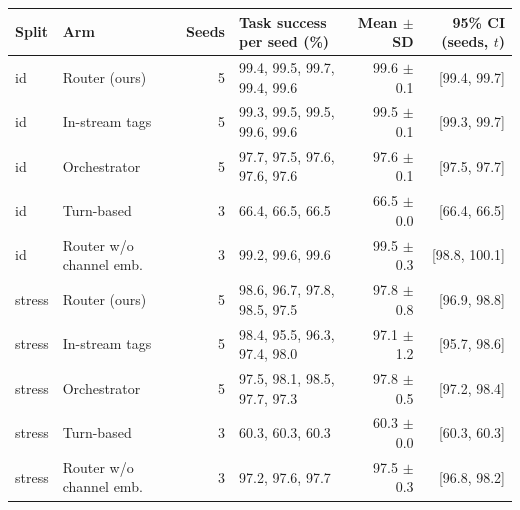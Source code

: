 \begin{tabular}{llrlrr}
\toprule
Split & Arm & Seeds & Task success per seed (\%) & Mean $\pm$ SD & 95\% CI (seeds, $t$) \\
\midrule
id & Router (ours) & 5 & 99.4, 99.5, 99.7, 99.4, 99.6 & 99.6 $\pm$ 0.1 & [99.4, 99.7] \\
id & In-stream tags & 5 & 99.3, 99.5, 99.5, 99.6, 99.6 & 99.5 $\pm$ 0.1 & [99.3, 99.7] \\
id & Orchestrator & 5 & 97.7, 97.5, 97.6, 97.6, 97.6 & 97.6 $\pm$ 0.1 & [97.5, 97.7] \\
id & Turn-based & 3 & 66.4, 66.5, 66.5 & 66.5 $\pm$ 0.0 & [66.4, 66.5] \\
id & Router w/o channel emb. & 3 & 99.2, 99.6, 99.6 & 99.5 $\pm$ 0.3 & [98.8, 100.1] \\
stress & Router (ours) & 5 & 98.6, 96.7, 97.8, 98.5, 97.5 & 97.8 $\pm$ 0.8 & [96.9, 98.8] \\
stress & In-stream tags & 5 & 98.4, 95.5, 96.3, 97.4, 98.0 & 97.1 $\pm$ 1.2 & [95.7, 98.6] \\
stress & Orchestrator & 5 & 97.5, 98.1, 98.5, 97.7, 97.3 & 97.8 $\pm$ 0.5 & [97.2, 98.4] \\
stress & Turn-based & 3 & 60.3, 60.3, 60.3 & 60.3 $\pm$ 0.0 & [60.3, 60.3] \\
stress & Router w/o channel emb. & 3 & 97.2, 97.6, 97.7 & 97.5 $\pm$ 0.3 & [96.8, 98.2] \\
\bottomrule
\end{tabular}
